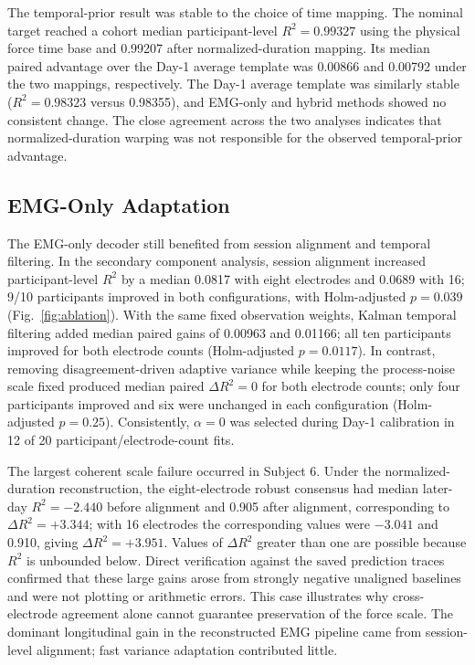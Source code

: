 \documentclass[preprint,12pt]{elsarticle}
\begin{document}
The temporal-prior result was stable to the choice of time mapping. The nominal target reached a cohort median participant-level $R^2=0.99327$ using the physical force time base and 0.99207 after normalized-duration mapping. Its median paired advantage over the Day-1 average template was 0.00866 and 0.00792 under the two mappings, respectively. The Day-1 average template was similarly stable ($R^2=0.98323$ versus 0.98355), and EMG-only and hybrid methods showed no consistent change. The close agreement across the two analyses indicates that normalized-duration warping was not responsible for the observed temporal-prior advantage.

\subsection{EMG-Only Adaptation}

The EMG-only decoder still benefited from session alignment and temporal filtering. In the secondary component analysis, session alignment increased participant-level $R^2$ by a median 0.0817 with eight electrodes and 0.0689 with 16; 9/10 participants improved in both configurations, with Holm-adjusted $p=0.039$ (Fig.~\ref{fig:ablation}). With the same fixed observation weights, Kalman temporal filtering added median paired gains of 0.00963 and 0.01166; all ten participants improved for both electrode counts (Holm-adjusted $p=0.0117$). In contrast, removing disagreement-driven adaptive variance while keeping the process-noise scale fixed produced median paired $\Delta R^2=0$ for both electrode counts; only four participants improved and six were unchanged in each configuration (Holm-adjusted $p=0.25$). Consistently, $\alpha=0$ was selected during Day-1 calibration in 12 of 20 participant/electrode-count fits.

The largest coherent scale failure occurred in Subject 6. Under the normalized-duration reconstruction, the eight-electrode robust consensus had median later-day $R^2=-2.440$ before alignment and 0.905 after alignment, corresponding to $\Delta R^2=+3.344$; with 16 electrodes the corresponding values were $-3.041$ and 0.910, giving $\Delta R^2=+3.951$. Values of $\Delta R^2$ greater than one are possible because $R^2$ is unbounded below. Direct verification against the saved prediction traces confirmed that these large gains arose from strongly negative unaligned baselines and were not plotting or arithmetic errors. This case illustrates why cross-electrode agreement alone cannot guarantee preservation of the force scale. The dominant longitudinal gain in the reconstructed EMG pipeline came from session-level alignment; fast variance adaptation contributed little.
\end{document}
